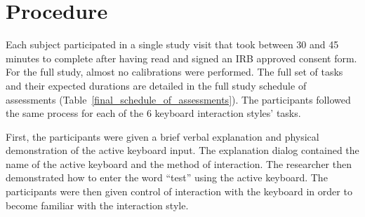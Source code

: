 \section{Procedure} \label{final_procedure}
Each subject participated in a single study visit that took between 30 and 45 minutes to complete after having read and signed an IRB approved consent form. For the full study, almost no calibrations were performed. The full set of tasks and their expected durations are detailed in the full study schedule of assessments (Table~\ref{final_schedule_of_assessments}). The participants followed the same process for each of the 6 keyboard interaction styles' tasks.

\begin{table}[t] %
	\centering
	\caption[Full Study Schedule of Assessments]{\centering Schedule of Assessments for a single study visit during the full study (in minutes).}
	\label{final_schedule_of_assessments}
\end{table}

First, the participants were given a brief verbal explanation and physical demonstration of the active keyboard input. The explanation dialog contained the name of the active keyboard and the method of interaction. The researcher then demonstrated how to enter the word ``test'' using the active keyboard. The participants were then given control of interaction with the keyboard in order to become familiar with the interaction style.


